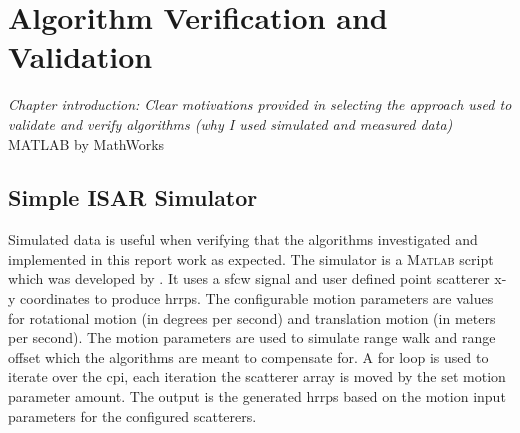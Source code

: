 \documentclass[class=report,11pt,crop=false]{standalone}
\begin{document}
\ifstandalone
\tableofcontents
\fi
\chapter{Algorithm Verification and Validation \label{ch:algorithmV&V}}

 

\emph{Chapter introduction: Clear motivations provided in selecting the approach used to validate and verify algorithms (why I used simulated and measured data)}
\textsc{MATLAB} by MathWorks \cite{mathworks}
\section{Simple ISAR Simulator}
Simulated data is useful when verifying that the algorithms investigated and implemented in this report work as expected. The simulator is a \textsc{Matlab} script which was developed by \cite{}. It uses a \gls{sfcw} signal and user defined point scatterer x-y coordinates to produce \gls{hrrp}s. The configurable motion parameters are values for rotational motion (in degrees per second) and translation motion (in meters per second). The motion parameters are used to simulate range walk and range offset which the algorithms are meant to compensate for. A for loop is used to iterate over the \gls{cpi}, each iteration the scatterer array is moved by the set motion parameter amount. The output is the generated \gls{hrrp}s based on the motion input parameters for the configured scatterers.
\end{document}
